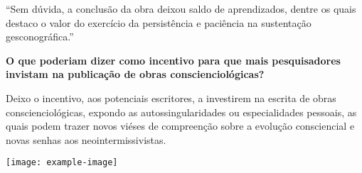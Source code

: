 \documentclass{gescons}
\begin{document}
\begin{multicols}{2}
\begin{pullquote}
``Sem dúvida, a conclusão da obra deixou saldo de aprendizados, dentre os quais destaco o valor do exercício da persistência e paciência na sustentação gesconográfica.''
\end{pullquote}

\textbf{O que poderiam dizer como incentivo para que mais pesquisadores invistam na publicação de obras conscienciológicas?}

Deixo o incentivo, aos potenciais escritores, a investirem na escrita de obras conscienciológicas, expondo as autossingularidades ou especialidades pessoais, as quais podem trazer novos viéses de compreenção sobre a evolução consciencial e novas senhas aos neointermissivistas. 


\begin{center}
    \noindent\texttt{[image: example-image]}
\end{center}
    
    \end{multicols}
\end{document}
